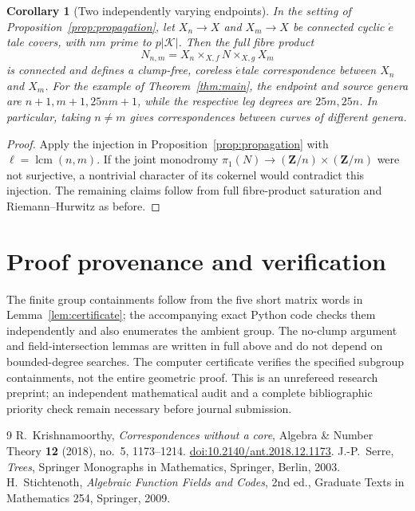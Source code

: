 \documentclass[11pt,a4paper,reqno]{amsart}
\newtheorem{corollary}[theorem]{Corollary}
\begin{document}
\begin{corollary}[Two independently varying endpoints]
\label{cor:mixed}
In the setting of Proposition~\ref{prop:propagation}, let
$X_n\to X$ and $X_m\to X$ be connected cyclic
\(\acute{e}\)tale covers, with $nm$ prime to $p|\mathcal K|$.
Then the full fibre product
\[
 N_{n,m}=X_n\times_{X,f}N\times_{X,g}X_m
\]
is connected and defines a clump-free, coreless
\(\acute{e}\)tale correspondence between $X_n$ and $X_m$.
For the example of Theorem~\ref{thm:main}, the endpoint
and source genera are $n+1,m+1,25nm+1$, while the
respective leg degrees are $25m,25n$.
In particular, taking $n\ne m$ gives correspondences between
curves of different genera.
\end{corollary}
\begin{proof}
Apply the injection in Proposition~\ref{prop:propagation}
with $\ell=\operatorname{lcm}(n,m)$.  If the joint monodromy
$\pi_1(N)\to(\mathbf Z/n)\times(\mathbf Z/m)$ were not
surjective, a nontrivial character of its cokernel would
contradict this injection.  The remaining claims follow from
full fibre-product saturation and Riemann--Hurwitz as before.
\end{proof}

\section*{Proof provenance and verification}
The finite group containments follow from the five short matrix words
in Lemma~\ref{lem:certificate}; the accompanying exact Python code
checks them independently and also enumerates the ambient group. The no-clump argument and field-intersection
lemmas are written in full above and do not depend on bounded-degree
searches. The computer certificate verifies the specified subgroup
containments, not the entire geometric proof. This is an unrefereed
research preprint; an independent mathematical audit and a complete
bibliographic priority check remain necessary before journal
submission.

\begin{thebibliography}{9}
R.~Krishnamoorthy, \emph{Correspondences without a core},
Algebra \& Number Theory \textbf{12} (2018), no.~5, 1173--1214.
\href{https://doi.org/10.2140/ant.2018.12.1173}{doi:10.2140/ant.2018.12.1173}.
J.-P.~Serre, \emph{Trees}, Springer Monographs in Mathematics,
Springer, Berlin, 2003.
H.~Stichtenoth, \emph{Algebraic Function Fields and Codes},
2nd ed., Graduate Texts in Mathematics 254, Springer, 2009.
\end{thebibliography}
\end{document}
